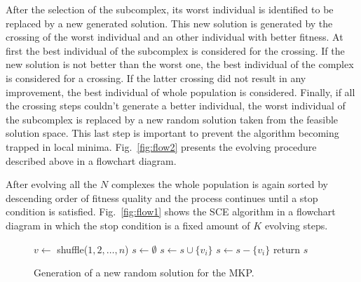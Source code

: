 After the selection of the subcomplex, its worst individual is identified to
be replaced by a new generated solution.
This new solution is generated by the crossing of the worst individual and an
other individual with better fitness.
At first the best individual of the subcomplex is considered for the crossing.
If the new solution is not better than the worst one, the best individual
of the complex is considered for a crossing.
If the latter crossing did not result in any improvement, the best individual
of whole population is considered.
Finally, if all the crossing steps couldn't generate a better individual,
the worst individual of the subcomplex is replaced by a new random solution taken
from the feasible solution space.
This last step is important to prevent the algorithm becoming trapped in local minima.
Fig.~\ref{fig:flow2} presents the evolving procedure described above in a flowchart diagram.

After evolving all the $N$ complexes the whole population is again
sorted by descending order of fitness quality and the process continues until
a stop condition is satisfied.
Fig.~\ref{fig:flow1} shows the SCE algorithm in a flowchart diagram in which
the stop condition is a fixed amount of $K$ evolving steps.

\begin{figure}
\begin{algorithmic}[1]
    \State $v \leftarrow $ shuffle($1, 2, \ldots, n$)
	\State $s \leftarrow \emptyset$ 
	  \State $s \leftarrow s \cup \{v_i\}$ 
	   
	    \State $s \leftarrow s - \{v_i\}$
      \EndIf
	\EndFor
  \State return $s$
  \EndProcedure
\end{algorithmic}
\caption{Generation of a new random solution for the MKP.}
\label{alg:new}
\end{figure}

